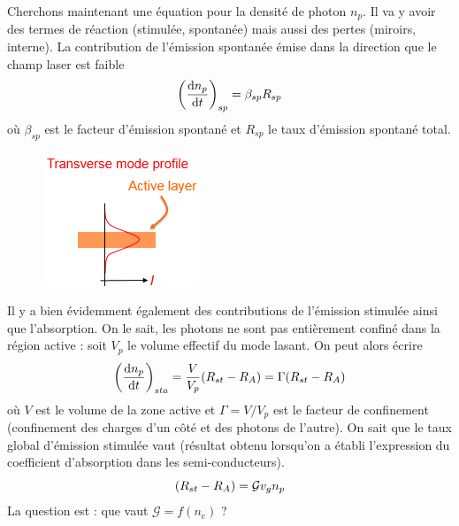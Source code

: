 	Cherchons maintenant une équation pour la densité de photon $n_p$. Il va y avoir des termes de
	réaction (stimulée, spontanée) mais aussi des pertes (miroirs, interne). La contribution de 
	l'émission spontanée émise dans la direction que le champ laser est faible
	\begin{equation}
	{\left(\frac{{{\rm{d}}{n_p}}}{{{\rm{d}}t}}\right)_{sp}} = {\beta _{sp}}{R_{sp}}
	\end{equation}
	où $\beta_{sp}$ est le facteur d'émission spontané et $R_{sp}$ le taux d'émission spontané 
	total.\\
	\begin{figure}
	\includegraphics[scale=0.75]{ch5/image45}
	\end{figure}
	 Il y a bien évidemment également des contributions de l'émission stimulée ainsi que 
	l'absorption. On le sait, les photons ne sont pas entièrement confiné dans la région 
	active : soit $V_p$ le volume effectif du mode lasant. On peut alors écrire
	\begin{equation}
	{\left(\frac{{{\rm{d}}{n_p}}}{{{\rm{d}}t}}\right)_{sta}} = \frac{V}{{{V_p}}}({R_{st}} - {R_A}) 
	= \Gamma ({R_{st}} - {R_A})
	\end{equation}
	où $V$ est le volume de la zone active et $\Gamma = V/V_p$ est le facteur de confinement 
	(confinement des charges d'un côté et des photons de l'autre). On sait que le taux global 
	d'émission stimulée vaut (résultat obtenu lorsqu'on a établi l'expression du coefficient 
	d'absorption dans les semi-conducteurs).
	\begin{equation}
	({R_{st}} - {R_A}) = {{\cal G}}{v_g}{n_p}
	\end{equation}
	La question est : que vaut $\mathcal{G} = f(n_e)$ ? \\
	
